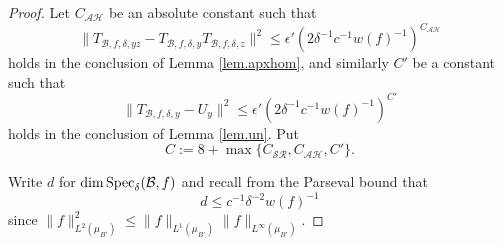 \documentclass[12pt]{amsart}
\numberwithin{equation}{section}
\theoremstyle{plain}
\theoremstyle{definition}
\renewcommand{\leq}{\leqslant}
\providecommand{\Spec}{\mathop{\rm Spec}\nolimits}
\begin{document}
\begin{proof}
Let $C_{\mathcal{A}\mathcal{H}}$ be an absolute constant such that
\begin{equation*}
\|T_{\mathcal{B},f,\delta,yz}- T_{\mathcal{B},f,\delta,y}T_{\mathcal{B},f,\delta,z}\|^2 \leq \epsilon'(2\delta^{-1}c^{-1}w(f)^{-1})^{C_{\mathcal{A}\mathcal{H}}}
\end{equation*}
holds in the conclusion of Lemma \ref{lem.apxhom}, and similarly $C'$ be a constant such that
\begin{equation*}
\|T_{\mathcal{B},f,\delta,y} - U_y\|^2 \leq \epsilon'(2\delta^{-1}c^{-1}w(f)^{-1})^{C'}
\end{equation*}
holds in the conclusion of Lemma \ref{lem.un}.  Put
\begin{equation*}
C:=8+\max\{C_{\mathcal{S}\mathcal{R}},C_{\mathcal{A}\mathcal{H}},C'\}.
\end{equation*}

Write $d$ for $\dim \Spec_\delta(\mathcal{B},f)$ and recall from the Parseval bound that
\begin{equation*}
d \leq c^{-1}\delta^{-2}w(f)^{-1}
\end{equation*}
since $\|f\|_{L^2(\mu_{B'})}^2 \leq\|f\|_{L^1(\mu_{B'})}\|f\|_{L^\infty(\mu_{B'})}$.


\end{proof}
\end{document}
